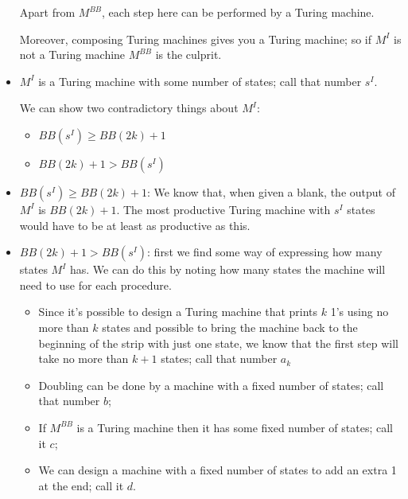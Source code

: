 \documentclass[justified]{tufte-handout}
\begin{document}
\begin{itemize}
\begin{itemize}
\end{itemize}

\noindent Apart from $M^{BB}$, each step here can be performed by a Turing machine.

\vspace{.2cm}

\noindent Moreover, composing Turing machines gives you a Turing machine; so if $M^I$ is not a Turing machine $M^{BB}$ is the culprit.

\item $M^I$ is a Turing machine with some number of states; call that number $s^I$. 

\noindent We can show two contradictory things about $M^I$:

\begin{itemize}

\item $BB(s^I) \geq BB(2k)+1$

\item $BB(2k)+1 > BB(s^I)$


\end{itemize}

\item $BB(s^I) \geq BB(2k)+1$: We know that, when given a blank, the output of $M^I$ is $BB(2k)+1$. The most productive Turing machine with $s^I$ states would have to be at least as productive as this. 


\item $BB(2k)+1 > BB(s^I)$: first we find some way of expressing how many states $M^I$ has. We can do this by noting how many states the machine will need to use for each procedure.

\begin{itemize}

\item Since it's possible to design a Turing machine that prints $k$ 1's using no more than $k$ states and possible to bring the machine back to the beginning of the strip with just one state, we know that the first step will take no more than $k+1$ states; call that number $a_k$


\item Doubling can be done by a machine with a fixed number of states; call that number $b$;

\item If $M^{BB}$ is a Turing machine then it has some fixed number of states; call it $c$;

\item We can design a machine with a fixed number of states to add an extra 1 at the end; call it $d$.



\end{itemize}
\end{itemize}
\end{document}
